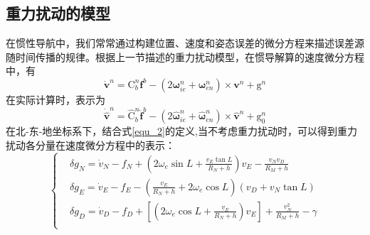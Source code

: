 \documentclass[12pt,a4,utf8]{article}
\newcommand{\bmmathrm}[1]{\bm{\mathrm{#1}}}
\begin{document}
\subsection{重力扰动的模型}
在惯性导航中，我们常常通过构建位置、速度和姿态误差的微分方程来描述误差源随时间传播的规律。根据上一节描述的重力扰动模型，在惯导解算的速度微分方程中，有
\begin{equation}
      \dot{\bm{v}}^n = \bmmathrm{C}^n_b\bm{f}^b - (2\bm{\omega}^n_{ie}+\bm{\omega}^n_{en})\times \bm{v}^n + \bmmathrm{g}^n
      \label{equ_delta_g}
\end{equation}
在实际计算时，表示为
\begin{equation*}
      \dot{\hat{\bm{v}}}^n = \hat{\bmmathrm{C}}^n_b \hat{\bm{f}}^b - (2\hat{\bm{\omega}}^n_{ie}+\hat{\bm{\omega}}^n_{en})\times \hat{\bm{v}}^n + \bmmathrm{g}^n_0
\end{equation*}
在北-东-地坐标系下，结合式\ref{equ_2}的定义,当不考虑重力扰动时，可以得到重力扰动各分量在速度微分方程中的表示：
\begin{equation}
      \left\{ \begin{aligned}
      & \delta {{g}_{N}}={{{\dot{v}}}_{N}}-{{f}_{N}}+(2{{\omega}_{e}}\sin L+\frac{{{v}_{E}}\tan L}{{{R}_{N}}+h}){{v}_{E}}-\frac{{{v}_{N}}{{v}_{D}}}{{{R}_{M}}+h} \\ 
      & \delta {{g}_{E}}={{{\dot{v}}}_{E}}-{{f}_{E}}-(\frac{{{v}_{E}}}{{{R}_{N}}+h}+2{{\omega}_{e}}\cos L)({{v}_{D}}+{{v}_{N}}\tan L) \\ 
      & \delta {{g}_{D}}={{{\dot{v}}}_{D}}-{{f}_{D}}+\left[(2{{\omega}_{e}}\cos L+\frac{{{v}_{E}}}{{{R}_{N}}+h}){{v}_{E}} \right]+\frac{v_{N}^{2}}{{{R}_{M}}+h}-\gamma  \\ 
      \end{aligned} \right.
      \label{equ_delta_g_more}
\end{equation}
\end{document}
